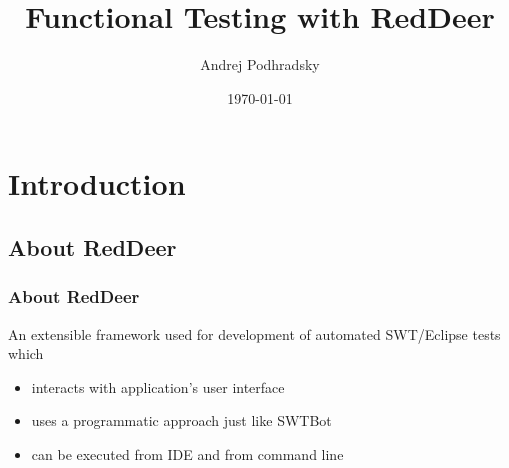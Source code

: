 \documentclass{beamer}
\begin{document}
\title{Functional Testing with RedDeer}   
\author{Andrej Podhradsky}
\date{\today} 



\frame{\titlepage} 



\section{Introduction}

\subsection{About RedDeer}
\begin{frame}[fragile]
\frametitle{About RedDeer}
An extensible framework used for development of automated SWT/Eclipse tests which
\begin{itemize}
\item interacts with application’s user interface
\item uses a programmatic approach just like SWTBot
\item can be executed from IDE and from command line
\end{itemize}
\end{frame}
\end{document}

